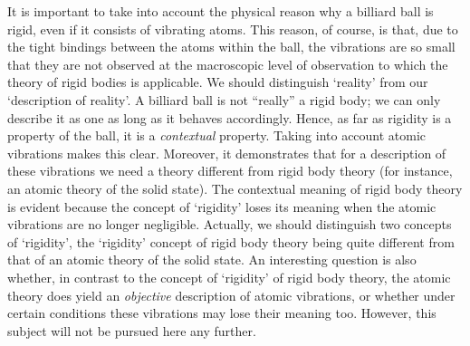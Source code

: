 \documentclass[12pt]{article}
\begin{document}
It is important to take into account the physical reason why a
billiard ball is rigid, even if it consists of vibrating atoms.
This reason, of course, is that, due to the tight bindings between
the atoms within the ball, the vibrations are so small that they
are not observed at the macroscopic level of observation to which
the theory of rigid bodies is applicable. We should distinguish
`reality' from our `description of reality'. A billiard ball is
not ``really'' a rigid body; we can only describe it as one as
long as it behaves accordingly. Hence, as far as rigidity is a
property of the ball, it is a {\em contextual} property. Taking
into account atomic vibrations makes this clear. Moreover, it
demonstrates that for a description of these vibrations we need a
theory different from rigid body theory (for instance, an atomic
theory of the solid state). The contextual meaning of rigid body
theory is evident because the concept of `rigidity' loses its
meaning when the atomic vibrations are no longer negligible.
Actually, we should distinguish two concepts of `rigidity', the
`rigidity' concept of rigid body theory being quite different from
that of an atomic theory of the solid state. An interesting
question is also whether, in contrast to the concept of
`rigidity' of rigid body theory, the atomic theory does yield an {\em
objective} description of atomic vibrations, or whether under
certain conditions these vibrations may lose their meaning too.
However, this subject will not be pursued here any further.
\end{document}
